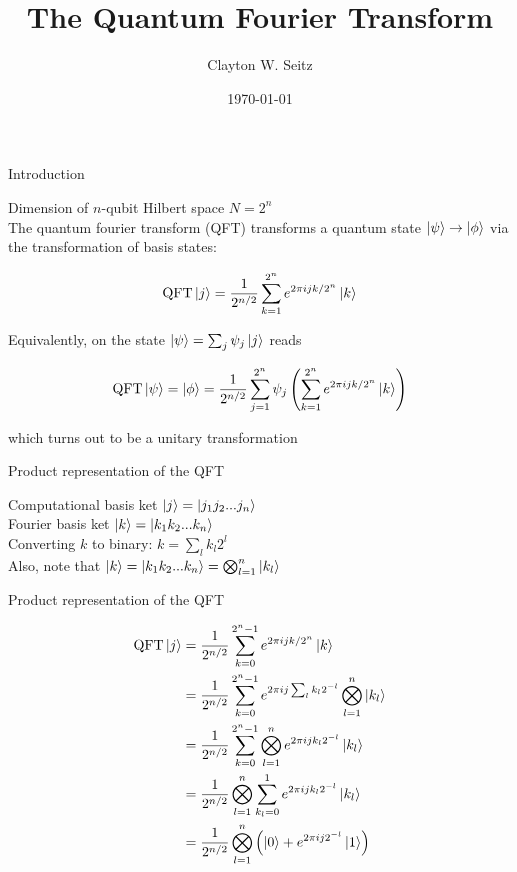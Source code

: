 \documentclass[aspectratio=1610]{beamer}					%
\title{The Quantum Fourier Transform}	%
\author{Clayton W. Seitz}								%
\date{\today}									%
\begin{document}
\begin{frame}
  \titlepage
\end{frame}

\begin{frame}{Introduction}

Dimension of $n$-qubit Hilbert space $N=2^{n}$\\
\vspace{0.2in}
The quantum fourier transform (QFT) transforms a quantum state $\ket{\psi}\rightarrow\ket{\phi}$ via the transformation of basis states:

\begin{equation*}
\mathrm{QFT}\ket{j} = \frac{1}{2^{n/2}}\sum_{k=1}^{2^{n}}e^{2\pi ijk/2^{n}}\ket{k}
\end{equation*}

Equivalently, on the state $\ket{\psi}=\sum_{j}\psi_{j}\ket{j}$ reads

\begin{equation*}
\mathrm{QFT}\ket{\psi} = \ket{\phi} = \frac{1}{2^{n/2}}\sum_{j=1}^{2^{n}}\psi_{j}\left(\sum_{k=1}^{2^{n}}e^{2\pi ijk/2^{n}}\ket{k}\right)
\end{equation*}

which turns out to be a unitary transformation

\end{frame}

\begin{frame}{Product representation of the QFT}

Computational basis ket $\ket{j} = \ket{j_{1}j_{2}...j_{n}}$\\
\vspace{0.1in}
Fourier basis ket $\ket{k} = \ket{k_{1}k_{2}...k_{n}}$\\
\vspace{0.1in}
Converting $k$ to binary: $k = \sum_{l}k_{l}2^{l}$ \\
\vspace{0.1in}
Also, note that $\ket{k} = \ket{k_{1}k_{2}...k_{n}} = \bigotimes_{l=1}^{n}\ket{k_{l}}$

\end{frame}

\begin{frame}{Product representation of the QFT}


\begin{align*}
\mathrm{QFT}\ket{j} &= \frac{1}{2^{n/2}}\sum_{k=0}^{2^{n}-1}e^{2\pi ijk/2^{n}}\ket{k}\\
&= \frac{1}{2^{n/2}}\sum_{k=0}^{2^{n}-1}e^{2\pi ij\sum_{l}k_{l}2^{-l}}\bigotimes_{l=1}^{n}\ket{k_{l}}\\
&= \frac{1}{2^{n/2}}\sum_{k=0}^{2^{n}-1}\bigotimes_{l=1}^{n}e^{2\pi ij k_{l}2^{-l}}\ket{k_{l}}\\
&= \frac{1}{2^{n/2}}\bigotimes_{l=1}^{n}\sum_{k_{l}=0}^{1}e^{2\pi ij k_{l}2^{-l}}\ket{k_{l}}\\
&= \frac{1}{2^{n/2}}\bigotimes_{l=1}^{n}\left(\ket{0}+e^{2\pi ij 2^{-l}}\ket{1}\right)\
\end{align*}

\end{frame}
\end{document}
